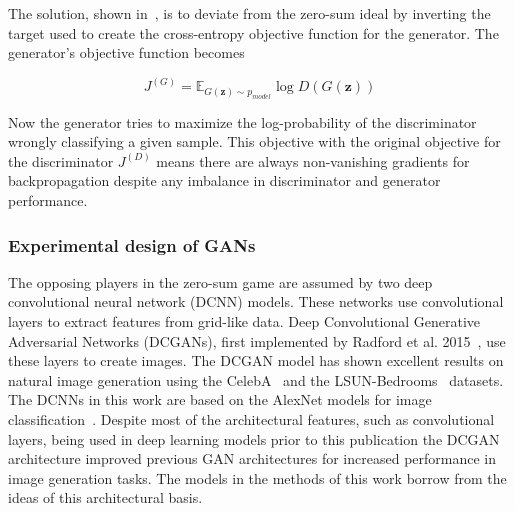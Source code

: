 \documentclass[twocolumn]{article}
\numberwithin{equation}{section}
\begin{document}
The solution, shown in~\cite{gf_gan}, is to deviate from the zero-sum ideal by inverting the target used to create the 
cross-entropy objective function for the generator. The generator's objective function becomes

\begin{equation}\label{eqn:J_G}
    J^{(G)} = \mathbb{E}_{G(\mathbf{z}) \sim p_{model}} \log D(G(\mathbf{z}))  
\end{equation}

Now the generator tries to maximize the log-probability of the discriminator wrongly classifying a given sample. This 
objective with the original objective for the discriminator $J^{(D)}$ means there are always non-vanishing gradients for 
backpropagation despite any imbalance in discriminator and generator performance. 


\subsubsection{Experimental design of GANs} 
The opposing players in the zero-sum game are assumed by two deep convolutional neural network (DCNN) models. These 
networks use convolutional layers to extract features from grid-like data. Deep Convolutional Generative Adversarial 
Networks (DCGANs), first implemented by Radford et al. 2015~\cite{dcgan}, use these layers to create images. The DCGAN 
model has shown excellent results on natural image generation using the CelebA~\cite{celebA} and the 
LSUN-Bedrooms~\cite{LSUN} datasets. The DCNNs in this work are based on the AlexNet models for image 
classification~\cite{dcnn}. Despite most of the architectural features, such as convolutional layers, being used in deep 
learning models prior to this publication the DCGAN architecture improved previous GAN architectures for increased 
performance in image generation tasks. The models in the methods of this work borrow from the ideas of this architectural 
basis.
\end{document}

